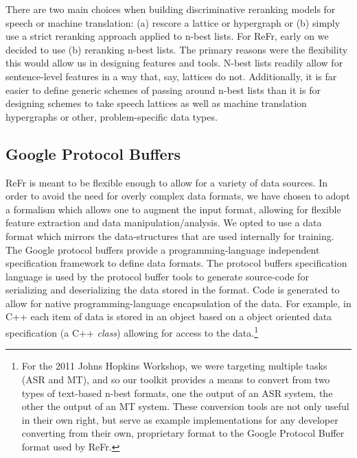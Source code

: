 \documentclass[a4paper]{article}
\begin{document}
There are two main choices when building discriminative reranking
models for speech or machine translation: (a) rescore a lattice or
hypergraph or (b) simply use a strict reranking approach applied to
n-best lists. For ReFr, early on we decided to use (b) reranking
n-best lists. The primary reasons were the flexibility this would
allow us in designing features and tools. N-best lists readily allow for
sentence-level features in a way that, say, lattices do not.
Additionally, it is far easier to define generic schemes of passing around
n-best lists than it is for designing schemes to take speech lattices as well
as machine translation hypergraphs or other, problem-specific data types.


\subsection{\label{sub:protobufs}Google Protocol Buffers}


ReFr is meant to be flexible enough to allow
for a variety of data sources. In order to avoid the need for overly complex data formats, we have
chosen to adopt a formalism which allows one to augment the input
format, allowing for flexible feature extraction and data manipulation/analysis.
We opted to use a data format which mirrors the data-structures that
are used internally for training. The Google protocol buffers\cite{protobuf}
provide a programming-language independent specification framework
to define data formats. The protocol buffers specification language
is used by the protocol buffer tools to generate source-code for serializing
and deserializing the data stored in the format. Code is generated
to allow for native programming-language encapsulation of the data.
For example, in C++ each item of data is stored in an object based
on a object oriented data specification (a C++ \emph{class}) allowing
for access to the data.\footnote{For the 2011 Johns Hopkins Workshop, we were targeting multiple tasks (ASR and MT), and so our toolkit provides a means to convert from two types of text-based n-best formats, one the output of an ASR system, the other the output of an MT system.  These conversion tools are not only useful in their own right, but serve as example implementations for any developer converting from their own, proprietary format to the Google Protocol Buffer format used by ReFr.}
\end{document}
